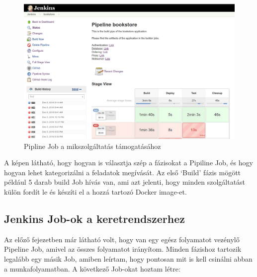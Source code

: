 \documentclass[11pt,magyar,a4paper,twoside,]{report}
\let\Oldincludegraphics\includegraphics
\renewcommand{\includegraphics}[1]{
\begin{adjustbox}{max size={\textwidth}{\textheight}}
    \Oldincludegraphics[scale=0.6]{#1}%
\end{adjustbox}
}
\begin{document}
\begin{figure}[H]
\centering
\includegraphics{img/pipeline-job.png}
\caption{Pipline Job a mikszolgáltatás támogatásához}
\end{figure}

A képen látható, hogy hogyan is választja szép a fázisokat a Pipiline
Job, és hogy hogyan lehet kategorizálni a feladatok megívását. Az első
`Build' fázis mögött például 5 darab build Job hívás van, ami azt
jelenti, hogy minden szolgáltatást külön fordít le és készíti el a hozzá
tartozó Docker image-et.

\subsection{Jenkins Job-ok a
keretrendszerhez}\label{jenkins-job-ok-a-keretrendszerhez}

Az előző fejezetben már látható volt, hogy van egy egész folyamatot
vezénylő Pipeline Job, amivel az összes folyamatot irányítom. Minden
fázishoz tartozik legalább egy másik Job, amiben leírtam, hogy pontosan
mit is kell csinálni abban a munkafolyamatban. A következő Job-okat
hoztam létre:
\end{document}
